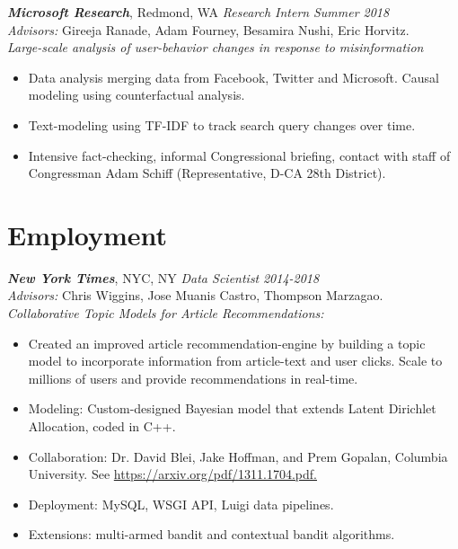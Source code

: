 \documentclass[margin]{res}
\begin{document}
\begin{resume}
{\sl \bf Microsoft Research}, Redmond, WA {\sl Research Intern} \hfill {\it Summer 2018}\\
\textit{Advisors:} Gireeja Ranade, Adam Fourney, Besamira Nushi, Eric Horvitz.\\
\textit{Large-scale analysis of user-behavior changes in response to misinformation}\\
\begin{itemize}
	\item Data analysis merging data from Facebook, Twitter and Microsoft. Causal modeling using counterfactual analysis.
	\item Text-modeling using TF-IDF to track search query changes over time.
	\item Intensive fact-checking, informal Congressional briefing, contact with staff of Congressman Adam Schiff (Representative, D-CA 28th District).
\end{itemize}


\section{Employment}
{\sl \bf New York Times}, NYC, NY {\sl Data Scientist} \hfill {\it 2014-2018}\\
\textit{Advisors:} Chris Wiggins, Jose Muanis Castro, Thompson Marzagao.\\
\textit{Collaborative Topic Models for Article Recommendations:} 
\begin{itemize}
	\item Created an improved article recommendation-engine by building a topic model to incorporate information from article-text and user clicks. Scale to millions of users and provide recommendations in real-time.
	\item Modeling: Custom-designed Bayesian model that extends Latent Dirichlet Allocation, coded in C++.
	\item Collaboration: Dr. David Blei, Jake Hoffman, and Prem Gopalan, Columbia University. See \url{https://arxiv.org/pdf/1311.1704.pdf.}
	\item Deployment: MySQL, WSGI API, Luigi data pipelines.
	\item Extensions: multi-armed bandit and contextual bandit algorithms.	
\end{itemize}


\end{resume}
\end{document}
